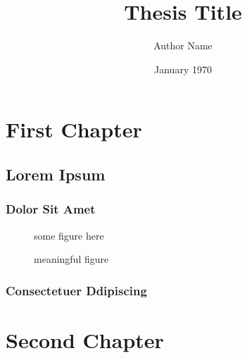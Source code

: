 \documentclass[
    draft,
    scrbook,
    listoffigures,
    listoftables,
    glossary]{cu-thesis}
\title{Thesis Title}
\author{Author Name}
\date{January 1970}
\begin{document}
    \frontmatter
    \pagestyle{headings}
    \chapter{First Chapter}
    \lipsum[1]

    \section*{Lorem Ipsum}
    \lipsum[3-5]

    \subsection*{Dolor Sit Amet}
    \lipsum[6-9]
    \begin{figure}
        \centering
        {some figure here}
        \caption[]{meaningful figure~\cite{nash51}}
    \end{figure}

    \subsection*{Consectetuer Ddipiscing}
    \lipsum[10-11]

    \chapter{Second Chapter}

    \appendix

    
    
\end{document}
